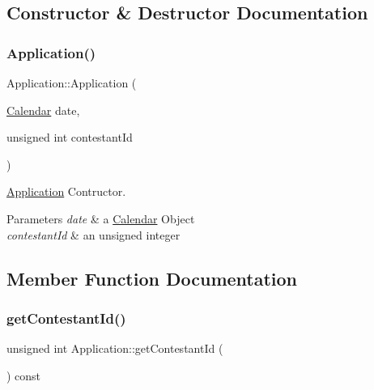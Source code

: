 \subsection{Constructor \& Destructor Documentation}
\mbox{\label{class_application_a562a062d2e3b12ce07550aa54c6cc4f2}} 
\subsubsection{\texorpdfstring{Application()}{Application()}}
{\footnotesize\ttfamily Application\+::\+Application (\begin{DoxyParamCaption}\item[{\hyperlink{class_calendar}{Calendar}}]{date,  }\item[{unsigned int}]{contestant\+Id }\end{DoxyParamCaption})}



\hyperlink{class_application}{Application} Contructor. 


\begin{DoxyParams}{Parameters}
{\em date} & a \hyperlink{class_calendar}{Calendar} Object \\
\hline
{\em contestant\+Id} & an unsigned integer \\
\hline
\end{DoxyParams}


\subsection{Member Function Documentation}
\mbox{\label{class_application_adeaebb7eed5b43dbb628eba135096ba8}} 
\subsubsection{\texorpdfstring{get\+Contestant\+Id()}{getContestantId()}}
{\footnotesize\ttfamily unsigned int Application\+::get\+Contestant\+Id (\begin{DoxyParamCaption}{ }\end{DoxyParamCaption}) const}



